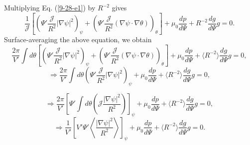 \documentclass{llncs}
\begin{document}
Multiplying Eq. (\ref{9-28-e1}) by $R^{- 2}$ gives
\begin{equation}
  \frac{1}{\mathcal{J}} \left[ \left( \Psi' \frac{\mathcal{J}}{R^2} | \nabla
  \psi |^2 \right)_{\psi} + \left( \Psi' \frac{\mathcal{J}}{R^2} (\nabla \psi
  \cdot \nabla \theta) \right)_{\theta} \right] + \mu_0 \frac{d p}{d \Psi} +
  R^{- 2} \frac{d g}{d \Psi} g = 0.
\end{equation}
Surface-averaging the above equation, we obtain
\begin{equation}
  \frac{2 \pi}{V'} \int d \theta \left[ \left( \Psi' \frac{\mathcal{J}}{R^2} |
  \nabla \psi |^2 \right)_{\psi} + \left( \Psi' \frac{\mathcal{J}}{R^2}
  (\nabla \psi \cdot \nabla \theta) \right)_{\theta} \right] + \mu_0 \frac{d
  p}{d \Psi} + \langle R^{- 2} \rangle \frac{d g}{d \Psi} g = 0,
\end{equation}
\begin{equation}
  \Rightarrow \frac{2 \pi}{V'} \int d \theta \left( \Psi'
  \frac{\mathcal{J}}{R^2} | \nabla \psi |^2 \right)_{\psi} + \mu_0 \frac{d
  p}{d \Psi} + \langle R^{- 2} \rangle \frac{d g}{d \Psi} g = 0,
\end{equation}

\begin{equation}
  \Rightarrow \frac{2 \pi}{V'} \left[ \Psi' \int d \theta \left( \mathcal{J}
  \frac{| \nabla \psi |^2}{R^2} \right) \right]_{\psi} + \mu_0 \frac{d p}{d
  \Psi} + \langle R^{- 2} \rangle \frac{d g}{d \Psi} g = 0,
\end{equation}
\begin{equation}
  \Rightarrow \frac{1}{V'} \left[ V' \Psi' \left\langle \frac{| \nabla \psi
  |^2}{R^2} \right\rangle \right]_{\psi} + \mu_0 \frac{d p}{d \Psi} + \langle
  R^{- 2} \rangle \frac{d g}{d \Psi} g = 0.
\end{equation}
\end{document}
